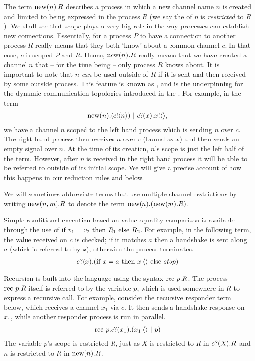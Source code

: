 	The term $\text{new}({n}). R$ describes a process in which a new channel name $n$ is created and limited to being expressed in the process $R$ (we say the  of $n$ is \emph{restricted} to $R$).  We shall see that scope plays a very big role in the way processes can establish new connections.  Essentially, for a process $P$ to have a connection to another process $R$ really means that they both `know' about a common channel $c$.  In that case, $c$ is scoped $P$ and $R$.  Hence, $\text{new}({n}). R$ really means that we have created a channel $n$ that -- for the time being -- only process $R$ knows about.  It is important to note that $n$ \emph{can} be used outside of $R$ if it is sent and then received by some outside process.  This feature is known as , and is the underpinning for the dynamic communication topologies introduced in the \picalc.  For example, in the term
\begin{align}
	\text{new}({n}). ({c}!\langle{n}\rangle) \ |\  {c}?({x}). {x}!\langle{}\rangle,
\end{align}
	we have a channel $n$ scoped to the left hand process which is sending $n$ over $c$. The right hand process then receives $n$ over $c$ (bound as $x$) and then sends an empty signal over $n$.  At the time of its creation, $n$'s scope is just the left half of the term.  However, after $n$ is received in the right hand process it will be able to be referred to outside of its initial scope.  We will give a precise account of how this happens in our reduction rules and  below.
	
	We will sometimes abbreviate terms that use multiple channel restrictions by writing $\text{new}({n,m}).R$ to denote the term $\text{new}({n}).(\text{new}({m}).R)$. 
	
	Simple conditional execution based on value equality comparison is available through the use of $\text{if } {v_1 = v_2}\text{ then } R_1 \text{ else } R_2$.  For example, in the following term, the value received on $c$ is checked; if it matches $a$ then a handshake is sent along $a$ (which is referred to by $x$), otherwise the process terminates.
	\begin{align}
		{c}?({x}).(\text{if } {x=a} \text{ then } {x}!\langle{}\rangle \text{ else } stop)
	\end{align}
	
	Recursion is built into the language using the syntax $\text{rec }{p}.R$.  The process $\text{rec }{p}.R$ itself is referred to by the variable $p$, which is used somewhere in $R$ to express a recursive call.  For example, consider the recursive responder term below, which receives a channel $x_1$ via $c$.  It then sends a handshake response on $x_1$, while another responder process is run in parallel.
	\begin{align}
		\text{rec }{p}.{c}?({x_1}).({x_1}!\langle{}\rangle \ |\  p)
		\label{reclistenerterm}
	\end{align}
The variable $p$'s scope is restricted $R$, just as $X$ is restricted to $R$ in ${c}?({X}).R$ and $n$ is restricted to $R$ in $\text{new}({n}).R$.
	

